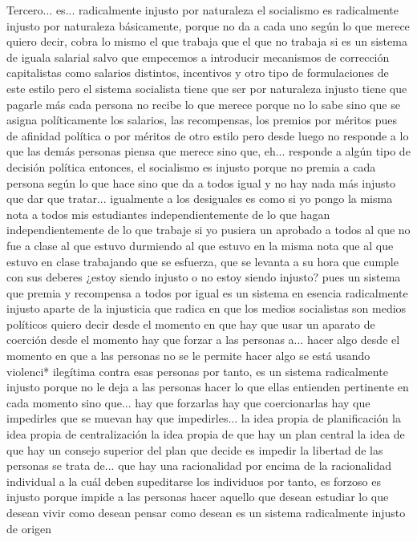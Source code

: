 Tercero... es... radicalmente injusto
por naturaleza el socialismo es radicalmente injusto por naturaleza
básicamente, porque no da a cada uno según lo que merece quiero decir, cobra lo mismo el que trabaja
que el que no trabaja si es un sistema de iguala salarial salvo que empecemos a introducir mecanismos de corrección capitalistas como salarios distintos, incentivos
y otro tipo de formulaciones de este estilo pero el sistema socialista tiene que ser por naturaleza
injusto tiene que pagarle más cada persona no recibe lo que merece porque no lo sabe sino que se asigna políticamente
los salarios, las recompensas, los premios por méritos pues de afinidad política
o por méritos de otro estilo pero desde luego no responde a lo que las demás personas piensa que merece
sino que, eh... responde a algún tipo de decisión política
entonces, el socialismo es injusto porque no premia a cada persona según lo que hace sino que da a todos igual
y no hay nada más injusto que dar que tratar... igualmente a los desiguales es como si yo pongo la misma nota
a todos mis estudiantes independientemente de lo que hagan independientemente de lo que trabaje si yo pusiera un aprobado a todos
al que no fue a clase al que estuvo durmiendo al que estuvo en la misma nota que al que estuvo en clase trabajando que se esfuerza, que se levanta a su hora
que cumple con sus deberes ¿estoy siendo injusto o no estoy siendo injusto? pues un sistema que premia y recompensa a todos por igual
es un sistema en esencia radicalmente injusto aparte de la injusticia que radica en que los medios
socialistas son medios políticos quiero decir desde el momento en que hay que usar un aparato de coerción
desde el momento hay que forzar a las personas a... hacer algo desde el momento en que a las personas no se le permite hacer algo
se está usando violenci* ilegítima contra esas personas
por tanto, es un sistema radicalmente injusto porque no le deja a las personas hacer lo que ellas entienden pertinente en cada momento
sino que... hay que forzarlas hay que coercionarlas hay que impedirles que se muevan
hay que impedirles... la idea propia de planificación la idea propia de centralización
la idea propia de que hay un plan central la idea de que hay un consejo superior del plan que decide
es impedir la libertad de las personas se trata de... que hay una racionalidad por encima de la racionalidad individual
a la cuál deben supeditarse los individuos por tanto, es forzoso es injusto porque impide a las personas
hacer aquello que desean estudiar lo que desean vivir como desean
pensar como desean es un sistema radicalmente injusto de origen
